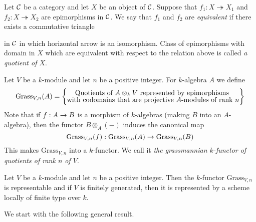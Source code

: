 \begin{definition}
Let ${\mathcal C}$ be a category and let $X$ be an object of ${\mathcal C}$. Suppose that $f_1:X\twoheadrightarrow X_1$ and $f_2:X\twoheadrightarrow X_2$ are epimorphisms in ${\mathcal C}$. We say that $f_1$ and $f_2$ are \textit{equivalent} if there exists a commutative triangle 
\begin{center}
\end{center}
in ${\mathcal C}$ in which horizontal arrow is an isomorphism. Class of epimorphisms with domain in $X$ which are equivalent with respect to the relation above is called \textit{a quotient of $X$}. 
\end{definition}

\begin{definition}
Let $V$ be a $k$-module and let $n$ be a positive integer. For $k$-algebra $A$ we define
$$\mathrm{Grass}_{V,n}(A) =\bigg\{    \begin{subarray}{c}
\mbox{Quotients of $A\otimes_kV$ represented by epimorphisms }\\
\mbox{with codomains that are projective $A$-modules of rank $n$}
\end{subarray}\bigg\}$$
 Note that if $f:A\rightarrow B$ is a morphism of $k$-algebras (making $B$ into an $A$-algebra), then the functor $B\otimes_A(-)$ induces the canonical map
$$\mathrm{Grass}_{V,n}(f):\mathrm{Grass}_{V,n}(A)\rightarrow \mathrm{Grass}_{V,n}(B)$$
This makes $\mathrm{Grass}_{V,n}$ into a $k$-functor. We call it \textit{the grassmannian $k$-functor of quotients of rank $n$ of $V$}.
\end{definition}

\begin{theorem}\label{theorem:representability_of_grassmannian}
Let $V$ be a $k$-module and let $n$ be a positive integer. Then the $k$-functor $\mathrm{Grass}_{V,n}$ is representable and if $V$ is finitely generated, then it is represented by a scheme locally of finite type over $k$.
\end{theorem}
\noindent
We start with the following general result.

